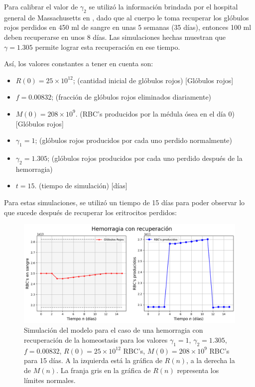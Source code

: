 Para calibrar el valor de $\gamma_2$ se utilizó la información brindada por el hospital general de Massachusetts en \cite{Massachusetts}, dado que al cuerpo le toma recuperar los glóbulos rojos perdidos en 450 ml de sangre en unas 5 semanas (35 días), entonces 100 ml deben recuperarse en unos 8 días. Las simulaciones hechas muestran que $\gamma=1.305$ permite lograr esta recuperación en ese tiempo.

Así, los valores constantes a tener en cuenta son:
\begin{itemize}
    \item $R(0) = 25\times 10^{12}$; (cantidad inicial de glóbulos rojos) [Glóbulos rojos]
    \item $f=0.00832$; (fracción de glóbulos rojos eliminados diariamente)
    \item $M(0) = 208 \times 10^{9}$. (RBC's producidos por la médula ósea en el día 0) [Glóbulos rojos]
    \item $\gamma_1=1$; (glóbulos rojos producidos por cada uno perdido normalmente)
    \item $\gamma_2=1.305$; (glóbulos rojos producidos por cada uno perdido después de la hemorragia)
    \item $t = 15$. (tiempo de simulación) [días]
\end{itemize}

Para estas simulaciones, se utilizó un tiempo de 15 días para poder observar lo que sucede después de recuperar los eritrocitos perdidos:

\begin{figure}[H]
    \centering
    \captionsetup{justification=centering}
    \includegraphics[scale=0.534]{figures/HemoLeveG13.png}
    \caption{Simulación del modelo para el caso de una hemorragia con recuperación de la homeostasis para los valores $\gamma_1 = 1$, $\gamma_2=1.305$, $f = 0.00832$, $R(0)=25\times 10^{12}$ RBC's, $M(0) = 208\times 10^{9}$ RBC's para 15 días. A la izquierda está la gráfica de $R(n)$, a la derecha la de $M(n)$. La franja gris en la gráfica de $R(n)$ representa los límites normales.}
    \label{sec:variaciones:fig:HemoLeveG13}
\end{figure}

